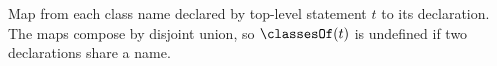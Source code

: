 Map from each class name declared by top-level statement $t$ to its declaration. The maps compose by
disjoint union, so $\classesOf(t)$ is undefined if two declarations share a name.
